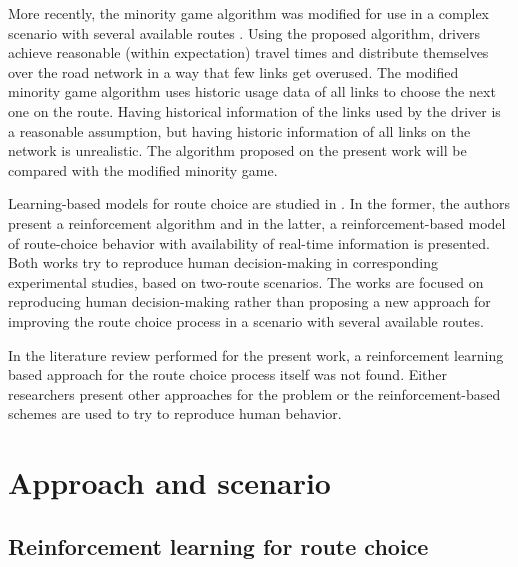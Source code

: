\documentclass[12pt]{llncs}
\begin{document}
More recently, the minority game algorithm was modified for use in a complex scenario with several available routes \cite{Galib&Moser2011}. Using the proposed algorithm, drivers achieve reasonable (within expectation) travel times and distribute themselves over the road network in a way that few links get overused. The modified minority game algorithm uses historic usage data of all links to choose the next one on the route. Having historical information of the links used by the driver is a reasonable assumption, but having historic information of all links on the network is unrealistic. The algorithm proposed on the present work will be compared with the modified minority game. 


Learning-based models for route choice are studied in \cite{Chmura&Pitz2007,Ben-Elia&Shiftan2010}. In the former, the authors present a reinforcement algorithm and in the latter, a reinforcement-based model of route-choice behavior with availability of real-time information is presented. Both works try to reproduce human decision-making in corresponding experimental studies, based on two-route scenarios. The works are focused on reproducing human decision-making rather than proposing a new approach for improving the route choice process in a scenario with several available routes.

In the literature review performed for the present work, a reinforcement learning based approach for the route choice process itself was not found. Either researchers present other approaches for the problem or the reinforcement-based schemes are used to try to reproduce human behavior.

\section{Approach and scenario}
\label{sec:proposal}

\subsection{Reinforcement learning for route choice}
\end{document}
